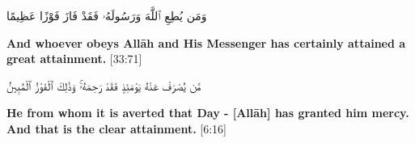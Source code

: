 \begin{center}
    \begin{RLtext}
        وَمَن يُطِعِ ٱللَّهَ وَرَسُولَهُۥ فَقَدْ فَازَ فَوْزًا عَظِيمًا 
    \end{RLtext}
    \textbf{And whoever obeys Allāh and His Messenger has certainly attained a great attainment.} [33:71]
\end{center}
\begin{center}
    \begin{RLtext}
        مَّن يُصْرَفْ عَنْهُ يَوْمَئِذٍ فَقَدْ رَحِمَهُۥۚ وَذَٰلِكَ ٱلْفَوْزُ ٱلْمُبِينُ 
    \end{RLtext}
    \textbf{He from whom it is averted that Day - [Allāh] has granted him mercy. And that is the clear attainment.} [6:16]
\end{center}
